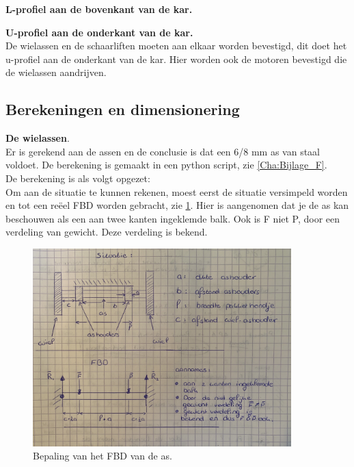 \textbf{L-profiel aan de bovenkant van de kar.}

\vspace{1mm}
\textbf{U-profiel aan de onderkant van de kar.}\\
De wielassen en de schaarliften moeten aan elkaar worden bevestigd, dit doet het u-profiel aan de onderkant van de kar. Hier worden ook de motoren bevestigd die de wielassen aandrijven.\\

\vspace{1mm}
\subsection{Berekeningen en dimensionering}
\label{se:berekening_en_dimensionering}
\vspace{\baselineskip}

\textbf{De wielassen}.\\
Er is gerekend aan de assen en de conclusie is dat een 6/8 mm as van staal voldoet. De berekening is gemaakt in een python script, zie \cref{Cha:Bijlage_F}.\\
\vspace{\baselineskip}
De berekening is als volgt opgezet:\\
Om aan de situatie te kunnen rekenen, moest eerst de situatie versimpeld worden en tot een reëel FBD worden gebracht, zie \cref{fig: as_FBD}. Hier is aangenomen dat je de as kan beschouwen als een aan twee kanten ingeklemde balk. Ook is F niet P, door een verdeling van gewicht. Deze verdeling is bekend.

\begin{figure}[H]
    \includegraphics[width = 100mm]{04_conceptdimensionering/As_FBD.jpg}
    \caption{Bepaling van het FBD van de as.}
    \label{fig: as_FBD}
\end{figure}

